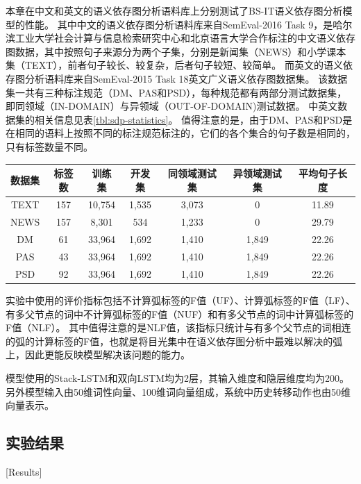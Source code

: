 本章在中文和英文的语义依存图分析语料库上分别测试了BS-IT语义依存图分析模型的性能。
其中中文的语义依存图分析语料库来自SemEval-2016 Task 9\cite{che-etal-2016-semeval}，是哈尔滨工业大学社会计算与信息检索研究中心和北京语言大学合作标注的中文语义依存图数据，其中按照句子来源分为两个子集，分别是新闻集（NEWS）和小学课本集（TEXT），前者句子较长、较复杂，后者句子较短、较简单。
而英文的语义依存图分析语料库来自SemEval-2015 Task 18\cite{oepen-etal-2015-semeval}英文广义语义依存图数据集。
该数据集一共有三种标注规范（DM、PAS和PSD），每种规范都有两部分测试数据集，即同领域（IN-DOMAIN）与异领域（OUT-OF-DOMAIN)测试数据。
中英文数据集的相关信息见表\ref{tbl:sdp-statistics}。
值得注意的是，由于DM、PAS和PSD是在相同的语料上按照不同的标注规范标注的，它们的各个集合的句子数是相同的，只有标签数量不同。

\begin{table}[htbp]
    \vspace{0.5em}\centering\wuhao
    \begin{tabular}{ccccccc}
        \toprule[1.5pt]
        数据集 & 标签数 & 训练集 & 开发集 & 同领域测试集 & 异领域测试集 & 平均句子长度 \\
        \midrule[1pt]
        TEXT & 157 & 10,754 & 1,535 & 3,073 & 0     & 11.89 \\
        NEWS & 157 & 8,301  & 534   & 1,233 & 0     & 29.79 \\
        DM   & 61  & 33,964 & 1,692 & 1,410 & 1,849 & 22.26 \\
        PAS  & 43  & 33,964 & 1,692 & 1,410 & 1,849 & 22.26 \\
        PSD  & 92  & 33,964 & 1,692 & 1,410 & 1,849 & 22.26 \\
        \bottomrule[1.5pt]
    \end{tabular}
\end{table}

实验中使用的评价指标包括不计算弧标签的F值（UF）、计算弧标签的F值（LF）、有多父节点的词中不计算弧标签的F值（NUF）和有多父节点的词中计算弧标签的F值（NLF）。
其中值得注意的是NLF值，该指标只统计与有多个父节点的词相连的弧的计算标签的F值，也就是将目光集中在语义依存图分析中最难以解决的弧上，因此更能反映模型解决该问题的能力。

模型使用的Stack-LSTM和双向LSTM均为2层，其输入维度和隐层维度均为200。
另外模型输入由50维词性向量、100维词向量组成，系统中历史转移动作也由50维向量表示。

\subsection{实验结果}[Results]

